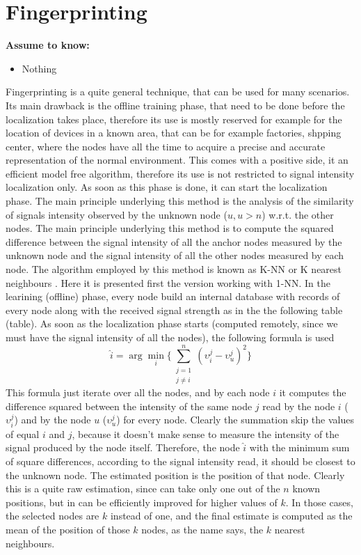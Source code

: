 \documentclass[12pt,twoside]{report}
\begin{document}
\section{Fingerprinting}
  \begin{center}
  \textbf{Assume to know:}
  \begin{itemize}
    \centering
    \item Nothing
  \end{itemize}
  \end{center}
Fingerprinting \cite{YIU2017235} is a quite general technique, that can be used for many scenarios. Its main drawback is the offline training phase, that need to be done before the localization takes place, therefore its use is mostly reserved for example for the location of devices in a known area, that can be for example factories, shpping center, where the nodes have all the time to acquire a precise and accurate representation of the normal environment. This comes with a positive side, it an efficient model free algorithm, therefore its use is not restricted to signal intensity localization only. As soon as this phase is done, it can start the localization phase. The main principle underlying this method is the analysis of the similarity of signals intensity observed by the unknown node ($u,u>n$) w.r.t. the other nodes. The main principle underlying this method is to compute the squared difference between the signal intensity of all the anchor nodes measured by the unknown node and the signal intensity of all the other nodes measured by each node.
The algorithm employed by this method is known as K-NN or K nearest neighbours \cite{10.5555/1162264}. Here it is presented first the version working with 1-NN.
In the learining (offline) phase, every node build an internal database with records of every node along with the received signal strength as in the the following table (table). As soon as the localization phase starts (computed remotely, since we must have the signal intensity of all the nodes), the following formula is used
\begin{equation}
    \hat{i}=\arg \min_i\bigg\{\sum_{\substack{j=1\\j\neq i}}^n(\upsilon_i^j-\upsilon_{u}^j)^2\bigg\}
\end{equation}
This formula just iterate over all the nodes, and by each node $i$ it computes the difference squared between the intensity of the same node $j$ read by the node $i$ ($\upsilon_i^j$) and by the node $u$ ($\upsilon_u^j$) for every node. Clearly the summation skip the values of equal $i$ and $j$, because it doesn't make sense to measure the intensity of the signal produced by the node itself. Therefore, the node $\hat{i}$ with the minimum sum of square differences, according to the signal intensity read, it should be closest to the unknown node. The estimated position is the position of that node. Clearly this is a quite raw estimation, since can take only one out of the $n$ known positions, but in can be efficiently improved for higher values of $k$. In those cases, the selected nodes are $k$ instead of one, and the final estimate is computed as the mean of the position of those $k$ nodes, as the name says, the $k$ nearest neighbours.
\end{document}
